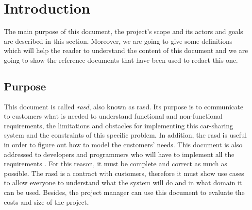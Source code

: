 \section{Introduction} \label{sec:intro}
The main purpose of this document, the project's scope and its actors and goals are described in this section. Moreover, we are going to give some definitions which will help the reader to understand the content of this document and we are going to show the reference documents that have been used to redact this one.


\subsection{Purpose} \label{subsec:purpose}
This document is called \emph{\acl{rasd}}, also known as %
\acs{rasd}. Its purpose is to communicate to customers what is needed to understand functional and non-functional requirements, 
the limitations and obstacles for implementing this car-sharing system and the constraints of this specific problem. In addition, the \acs{rasd} is useful in order to figure out how to model the customers' needs. %
This document is also addressed to developers and programmers who will have to implement all the requirements%
. For this reason, it must be complete and correct as much as possible.
The \acs{rasd} is a contract with customers, therefore it must show use cases to allow everyone to understand what the system will do and in what domain it can be used. 
Besides, the project manager can use this document to evaluate the costs and size of the project.

